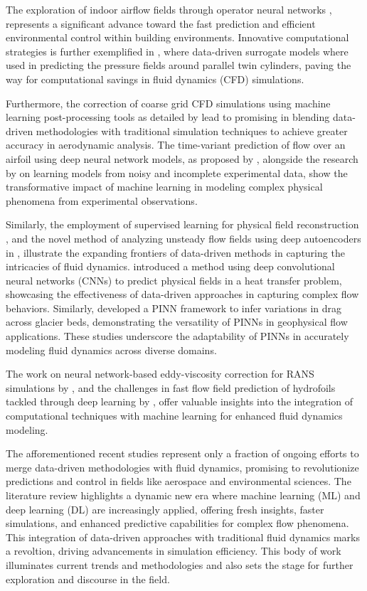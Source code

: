 The exploration of indoor airflow fields through operator neural networks \cite{Gao2024}, represents a significant advance toward the fast prediction and efficient environmental control within building environments. Innovative computational strategies is further exemplified in \citet{Min2024}, where data-driven surrogate models where used in predicting the pressure fields around parallel twin cylinders, paving the way for computational savings in fluid dynamics (CFD) simulations.

Furthermore, the correction of coarse grid CFD simulations using machine learning post-processing tools as detailed by \citet{Kiener2023} lead to promising in blending data-driven methodologies with traditional simulation techniques to achieve greater accuracy in aerodynamic analysis. The time-variant prediction of flow over an airfoil using deep neural network models, as proposed by \cite{Peng2020b}, alongside the research by \citet{Reinbold2021d} on learning models from noisy and incomplete experimental data, show the transformative impact of machine learning in modeling complex physical phenomena from experimental observations.

Similarly, the employment of supervised learning for physical field reconstruction \cite{Liu2021c}, and the novel method of analyzing unsteady flow fields using deep autoencoders in \cite{Omata2019c}, illustrate the expanding frontiers of data-driven methods in capturing the intricacies of fluid dynamics. \citet{Liu2021c} introduced a method using deep convolutional neural networks (CNNs) to predict physical fields in a heat transfer problem, showcasing the effectiveness of data-driven approaches in capturing complex flow behaviors. Similarly, \citet{Riel2021c} developed a PINN framework to infer variations in drag across glacier beds, demonstrating the versatility of PINNs in geophysical flow applications. These studies underscore the adaptability of PINNs in accurately modeling fluid dynamics across diverse domains.

The work on neural network-based eddy-viscosity correction for RANS simulations by \cite{Volpiani2022}, and the challenges in fast flow field prediction of hydrofoils tackled through deep learning by \cite{Li2023}, offer valuable insights into the integration of computational techniques with machine learning for enhanced fluid dynamics modeling.

The afforementioned recent studies represent only a fraction of ongoing efforts to merge data-driven methodologies with fluid dynamics, promising to revolutionize predictions and control in fields like aerospace and environmental sciences. The literature review highlights a dynamic new era where machine learning (ML) and deep learning (DL) are increasingly applied, offering fresh insights, faster simulations, and enhanced predictive capabilities for complex flow phenomena. This integration of data-driven approaches with traditional fluid dynamics marks a revoltion, driving advancements in simulation efficiency. This body of work illuminates current trends and methodologies and also sets the stage for further exploration and discourse in the field.